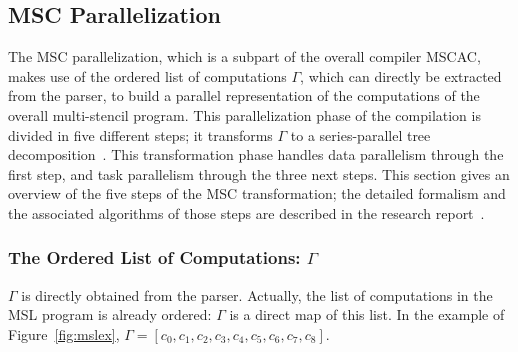 \subsection{MSC Parallelization}
The MSC parallelization, which is a subpart of the overall compiler MSCAC, makes use of the ordered list of computations $\Gamma$, which can directly be extracted from the parser, to build a parallel representation of the computations of the overall multi-stencil program. This parallelization phase of the compilation is divided in five different steps; it transforms $\Gamma$ to a series-parallel tree decomposition~\cite{Valdes:1979:RSP:800135.804393}. This transformation phase handles data parallelism through the first step, and task parallelism through the three next steps. This section gives an overview of the five steps of the MSC transformation; the detailed formalism and the associated algorithms of those steps are described in the research report~\cite{????}.

\subsubsection*{The Ordered List of Computations: $\Gamma$}
$\Gamma$ is directly obtained from the parser. Actually, the list of computations in the MSL program is already ordered: $\Gamma$ is a direct map of this list. In the example of Figure~\ref{fig:mslex}, $\Gamma = [c_0,c_1,c_2,c_3,c_4,c_5,c_6,c_7,c_8]$.

